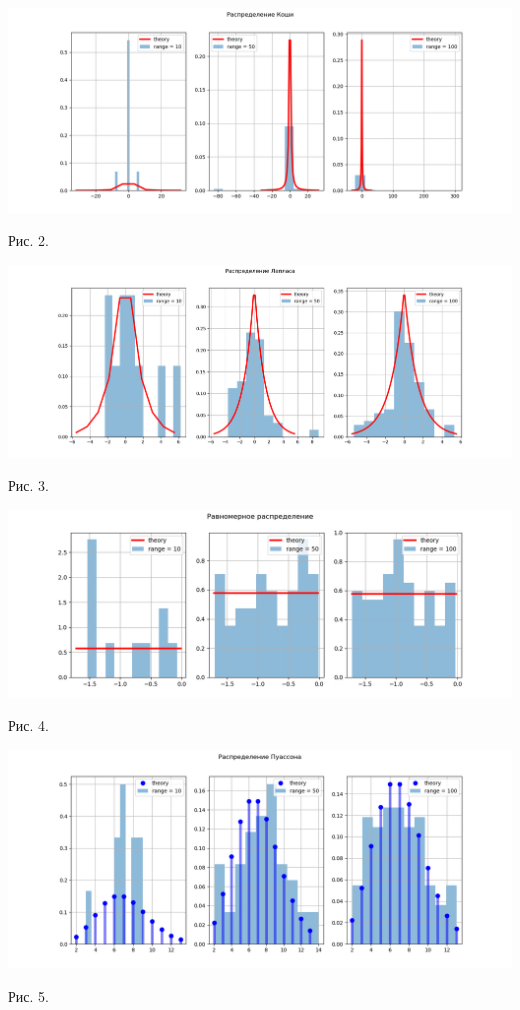 \documentclass[12pt]{article}
\begin{document}
\includegraphics[width=\textwidth]{caushi.png}
\begin{center}
Рис. 2. 
\end{center}

\includegraphics[width=\textwidth]{laplace.png}
\begin{center}
Рис. 3. 
\end{center}

\includegraphics[width=\textwidth]{uniform.png}
\begin{center}
Рис. 4. 
\end{center}

\includegraphics[width=\textwidth]{poisson.png}
\begin{center}
Рис. 5. 
\end{center}
\end{document}

